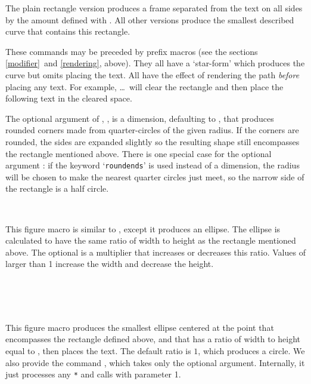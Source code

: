 \documentclass[letterpaper]{article}
\begin{document}
The plain rectangle version produces a frame separated from the text on
all sides by the amount defined with . All other versions
produce the smallest described curve that contains this rectangle.

These commands may be preceded by prefix macros (see the sections
\ref{modifier}~and \ref{rendering}, above). They all have a
`star-form' which produces the curve but omits placing the text.
All have the effect of rendering the path \emph{before} placing any
text. For example, \dots\ will clear the
rectangle and then place the following text in the cleared space.

The optional argument of , , is a dimension,
defaulting to \dim{0pt}, that produces rounded corners made from
quarter-circles of the given radius. If the corners are rounded, the
sides are expanded slightly so the resulting shape still encompasses the
rectangle mentioned above. There is one special case for the optional
argument : if the keyword `\texttt{roundends}' is used instead
of a dimension, the radius will be chosen to make the nearest quarter
circles just meet, so the narrow side of the rectangle is a half circle.

\begin{cd}
%
    \\
%
\end{cd}

This figure macro is similar to , except it produces an
ellipse. The ellipse is calculated to have the same ratio of width to
height as the rectangle mentioned above. The optional  is a
multiplier that increases or decreases this ratio. Values of 
larger than 1 increase the width and decrease the height.

\begin{cd}
%
    \\
\\
\\
%
%
\end{cd}

This figure macro produces the smallest ellipse centered at the point
that encompasses the rectangle defined above, and that has a ratio of
width to height equal to , then places the text. The default
ratio is $1$, which produces a circle. We also provide the command
, which takes only the  optional
argument. Internally, it just processes any \texttt{*} and calls
 with parameter 1.
\end{document}
